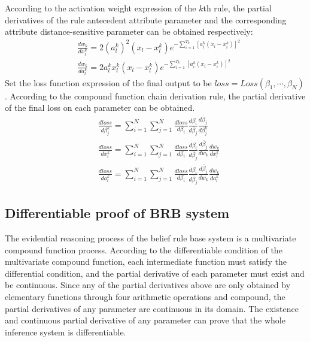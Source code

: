 \documentclass{ieeeaccess}
\begin{document}
According to the activation weight expression of the $k$th rule, the partial derivatives of the rule antecedent attribute parameter and the corresponding attribute distance-sensitive parameter can be obtained respectively:
\begin{align}
     & \frac{dw_k}{dx_l^k}=2(a_l^k)^2(x_l-x_l^k)e^{-\sum_{i=1}^{T_k}[a_i^k(x_i-x_i^k)]^2}  \\
     & \frac{dw_k}{da_l^k}=2a_l^kx_l^k(x_l-x_l^k)e^{-\sum_{i=1}^{T_k}[a_i^k(x_i-x_i^k)]^2}
\end{align}
Set the loss function expression of the final output to be $loss=Loss(\beta_1,\cdots,\beta_N)$.
According to the compound function chain derivation rule, the partial derivative of the final loss on each parameter can be obtained.
\begin{align}
     & \frac{dloss}{d\beta_j^k}=\sum_{i=1}^N\sum_{j=1}^N\frac{dloss}{d\beta_i}\frac{d\beta_i}{d\overline{\beta}_j}\frac{d\overline{\beta}_j}{d\beta_j^k}          \\
     & \frac{dloss}{dx_l^k}=\sum_{i=1}^N\sum_{j=1}^N\frac{dloss}{d\beta_i}\frac{d\beta_i}{d\overline{\beta}_j}\frac{d\overline{\beta}_j}{dw_k}\frac{dw_k}{dx_l^k} \\
     & \frac{dloss}{da_l^k}=\sum_{i=1}^N\sum_{j=1}^N\frac{dloss}{d\beta_i}\frac{d\beta_i}{d\overline{\beta}_j}\frac{d\overline{\beta}_j}{dw_k}\frac{dw_k}{da_l^k}
\end{align}

\subsection{Differentiable proof of BRB system}
The evidential reasoning process of the belief rule base system is a multivariate compound function process.
According to the differentiable condition of the multivariate compound function, each intermediate function must satisfy the differential condition,
and the partial derivative of each parameter must exist and be continuous.
Since any of the partial derivatives above are only obtained by elementary functions through four arithmetic operations and compound,
the partial derivatives of any parameter are continuous in its domain.
The existence and continuous partial derivative of any parameter can prove that the whole inference system is differentiable.
\end{document}
